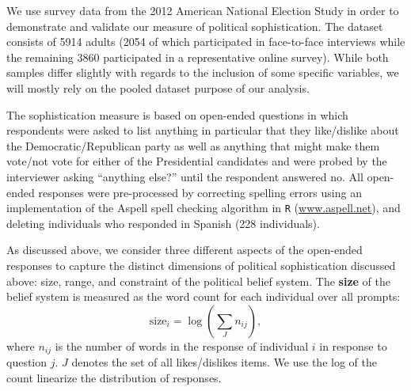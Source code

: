 \documentclass[12pt]{article}
\begin{document}
We use survey data from the 2012 American National Election Study in order to demonstrate and validate  our measure of political sophistication. The dataset consists of 5914 adults (2054 of which participated in face-to-face interviews while the remaining 3860 participated in a representative online survey). While both samples differ slightly with regards to the inclusion of some specific variables, we will mostly rely on the pooled dataset purpose of our analysis.

The sophistication measure is based on open-ended questions in which respondents were asked to list anything in particular that they like/dislike about the Democratic/Republican party as well as anything that might make them vote/not vote for either of the Presidential candidates and were probed by the interviewer asking ``anything else?'' until the respondent answered no. All open-ended responses were pre-processed by correcting spelling errors using an implementation of the Aspell spell checking algorithm in \texttt{R} (\url{www.aspell.net}), and deleting individuals who responded in Spanish (228 individuals). 

As discussed above, we consider three different aspects of the open-ended responses to capture the distinct dimensions of political sophistication discussed above: size, range, and constraint of the political belief system. The \textbf{size} of the belief system is measured as the word count for each individual over all prompts:
\begin{equation}
\text{size}_i = \log\left(\sum_J n_{ij}\right),
\end{equation}
where $n_{ij}$ is the number of words in the response of individual $i$ in response to question $j$. $J$ denotes the set of all likes/dislikes items. We use the log of the count linearize the distribution of responses.
\end{document}
